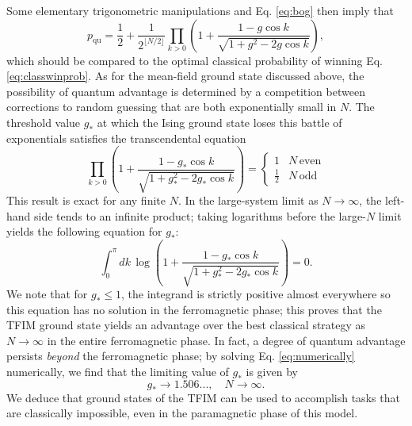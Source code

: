 \documentclass[prb,twocolumn,showpacs,amssymb,superscriptaddress]{revtex4-2}
\begin{document}
Some elementary trigonometric manipulations and Eq. \eqref{eq:bog} then imply that
\begin{equation}
\label{eq:exactTFIM}
p_{\mathrm{qu}} = \frac{1}{2}+\frac{1}{2^{\lfloor N/2\rfloor}}\prod_{k>0}\left(1+ \frac{1-g \cos{k}}{\sqrt{1+g^2-2 g \cos{k}}}\right),
\end{equation}
which should be compared to the optimal classical probability of winning Eq. \eqref{eq:classwinprob}. As for the mean-field ground state discussed above, the possibility of quantum advantage is determined by a competition between corrections to random guessing that are both exponentially small in $N$. The threshold value $g_*$ at which the Ising ground state loses this battle of exponentials satisfies the transcendental equation
\begin{equation}
\prod_{k>0}\left(1+ \frac{1-g_* \cos{k}}{\sqrt{1+g_*^2-2g_* \cos{k}}}\right) = \begin{cases} 1 & N \, \mathrm{even} \\ \frac{1}{2} & N \, \mathrm{odd}\end{cases}
\end{equation}
This result is exact for any finite $N$. In the large-system limit as $N\to \infty$, the left-hand side tends to an infinite product; taking logarithms before the large-$N$ limit yields the following equation for $g_*$:
\begin{equation}
\label{eq:numerically}
\int_{0}^\pi dk \, \log{\left(1 + \frac{1-g_* \cos{k}}{\sqrt{1+g_*^2-2g_* \cos{k}}}\right)} = 0.
\end{equation}
We note that for $g_* \leq 1$, the integrand is strictly positive almost everywhere so this equation has no solution in the ferromagnetic phase; this proves that the TFIM ground state yields an advantage over the best classical strategy as $N \to \infty$ in the entire ferromagnetic phase. In fact, a degree of quantum advantage persists \emph{beyond} the ferromagnetic phase; by solving Eq. \eqref{eq:numerically} numerically, we find that the limiting value of $g_*$ is given by 
\begin{equation}
\label{eq:exactg}
g_* \to 1.506..., \quad N \to \infty.
\end{equation}
We deduce that ground states of the TFIM can be used to accomplish tasks that are classically impossible, even in the paramagnetic phase of this model.
\end{document}
